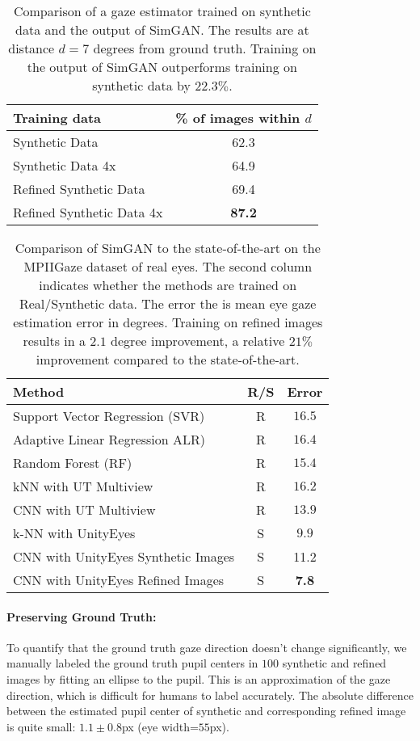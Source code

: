 \documentclass[10pt,twocolumn,letterpaper]{article}
\begin{document}
\begin{table}[]
\centering
\begin{tabular}{|l|c|} \hline
Training data  & \% of images within $d$  \\ \hline 
Synthetic Data & 62.3 \\
Synthetic Data 4x & 64.9 \\
Refined Synthetic Data & 69.4 \\
Refined Synthetic Data 4x & {\bf 87.2} \\
   \hline
\end{tabular}
\caption{Comparison of a gaze estimator trained on synthetic data and the output of SimGAN.
The results are at distance $d=7$ degrees from ground truth.
Training on the output of SimGAN outperforms training on synthetic data by $22.3\%$.
}
\label{tab:results_table_gaze}
\end{table}


\begin{table}[]
\centering
\begin{tabular}{|l|c|c|} \hline
 Method  & R/S & Error   \\ \hline 
  Support Vector Regression (SVR)~\cite{Schneider2014} & R &  $16.5$ \\
  Adaptive Linear Regression ALR)~\cite{Lu2014} & R & $16.4$ \\
  Random Forest  (RF)~\cite{Sugano2014} & R & $15.4$ \\
  kNN with UT Multiview~\cite{Zhang15a} & R & $16.2$ \\
 CNN with UT Multiview~\cite{Zhang15a}& R & $13.9$ \\ 
  k-NN with UnityEyes~\cite{Wood16}& S & $9.9$ \\
 CNN with UnityEyes Synthetic Images & S & 11.2 \\ 
 CNN with UnityEyes Refined Images & S & {\bf 7.8} \\ \hline
 
\end{tabular}
\caption{Comparison of SimGAN to the state-of-the-art on the MPIIGaze dataset of real eyes.
The second column indicates whether the methods are trained on Real/Synthetic data.
The error the is mean eye gaze estimation error in degrees.
Training on refined images results in a $2.1$ degree improvement, a relative $21\%$ improvement compared to the state-of-the-art.}
\label{tab:MPIIGaze_result}
\end{table}

\paragraph{Preserving Ground Truth:}
To quantify that the ground truth gaze direction doesn't change significantly, we manually labeled the ground truth pupil centers in $100$ synthetic and refined images by fitting an ellipse to the pupil. 
This is an approximation of the gaze direction, which is difficult for humans to label accurately.
The absolute difference between the estimated pupil center of synthetic and corresponding refined image is quite small: $1.1\pm0.8$px (eye width=$55$px). 
\end{document}
